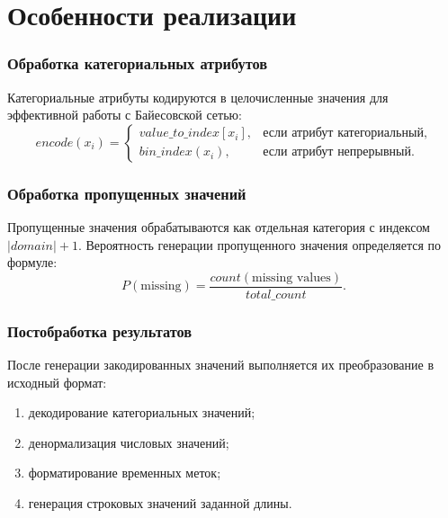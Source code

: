 \section{Особенности реализации}

\subsubsection{Обработка категориальных атрибутов}

Категориальные атрибуты кодируются в целочисленные значения для эффективной работы с Байесовской сетью:
\begin{equation}
    encode(x_i) = \begin{cases}
        value\_to\_index[x_i], & \text{если атрибут категориальный}, \\
        bin\_index(x_i), & \text{если атрибут непрерывный}.
    \end{cases}
\end{equation}

\subsubsection{Обработка пропущенных значений}

Пропущенные значения обрабатываются как отдельная категория с индексом $|domain| + 1$. Вероятность генерации пропущенного значения определяется по формуле:
\begin{equation}
    P(\text{missing}) = \frac{count(\text{missing values})}{total\_count}.
\end{equation}

\subsubsection{Постобработка результатов}

После генерации закодированных значений выполняется их преобразование в исходный формат:
\begin{enumerate}[label*=---]
	\item декодирование категориальных значений;
	\item денормализация числовых значений;
	\item форматирование временных меток;
	\item генерация строковых значений заданной длины.
\end{enumerate}


